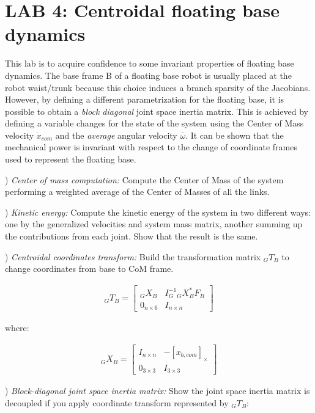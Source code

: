 \documentclass{report}
\newcommand{\mat}[1]{\ensuremath{\begin{bmatrix}#1\end{bmatrix}}}	%
\begin{document}
\section*{LAB 4: Centroidal floating base  dynamics}

This lab is to acquire confidence to some invariant properties of floating base dynamics. 
The base frame B of a floating base robot is usually placed at the robot waist/trunk because this choice induces a  branch sparsity of the Jacobians. 
However, by defining a different parametrization for the floating base, it is possible to obtain a \textit{block diagonal} joint space inertia matrix.  This is achieved by defining a variable changes for the state of the system using the Center of Mass velocity $\dot{x}_{com}$ and the \textit{average} angular velocity $\bar{\omega}$.  It can be shown that the mechanical power is invariant with respect to the change of coordinate frames used to represent the floating base. 

\quad

) \textit{Center of mass computation:}
Compute the Center of Mass of the system performing a weighted average of the Center of Masses of all the links. 

\quad

) \textit{Kinetic energy:}
Compute the kinetic energy of the system in two different ways: one by the generalized velocities and system mass matrix, another summing up the contributions from each joint. Show that the result is the same. 

\quad

) \textit{Centroidal coordinates transform:} 
Build the transformation matrix ${}_GT_B$ to change coordinates from base to CoM frame.


\begin{align}
{}_GT_B  = \mat{    {}_GX_B  & I_G^{-1} {}_GX_B^{*} F_B  \\ 0_{n \times 6} &   I_{n \times n} }
\end{align}

where: 

\begin{align}
 {}_GX_B = \mat{ I_{n \times n}  & -[x_{b, com}]_{\times} \\ 0_{3 \times 3} & 	 I_{3 \times 3}}
 	\label{fig:}
\end{align}

\quad

) \textit{Block-diagonal joint space inertia matrix:}
Show the joint space inertia  matrix is decoupled if you apply coordinate transform represented by  ${}_GT_B$:
\end{document}
